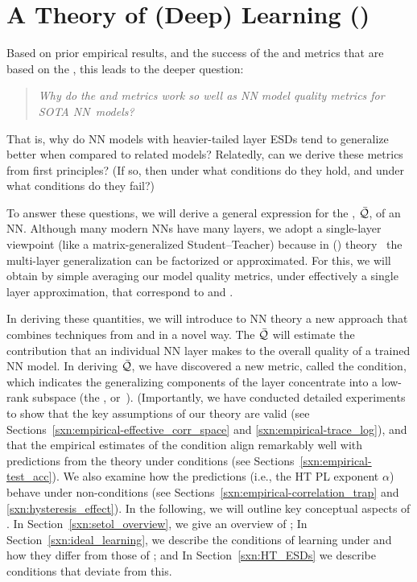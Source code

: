 \section{A \SemiEmpirical Theory of (Deep) Learning (\SETOL)}
\label{sxn:setol}
Based on prior empirical results, and the success of the \ALPHA and \ALPHAHAT metrics that are based on the \HTSR \Phenomenology, this leads to the deeper question: 
%
\begin{quote}
\emph{Why do the \ALPHA and \ALPHAHAT metrics work so well as NN model quality metrics for SOTA NN~models?}
\end{quote}
That is, why do NN models with heavier-tailed layer ESDs tend to generalize better when compared to related models?
Relatedly, can we derive these metrics from first principles?
(If so, then under what conditions do they hold, and under what conditions do they fail?)


\noindent
To answer these questions, we will derive a general expression for the \LayerQuality, $\bar{\mathcal{Q}}$, of an NN.
Although many modern NNs have many layers, we adopt a single-layer viewpoint (like a matrix-generalized Student–Teacher) because in \StatisticalMechanicsOfGeneralization (\SMOG) theory~\cite{SST92,STS90} the multi-layer generalization can be factorized or approximated.
For this, we will obtain by simple averaging our model quality metrics, under effectively a single layer approximation, that correspond to \ALPHA and \ALPHAHAT.


In deriving these quantities, we will introduce to NN theory a new \SemiEmpirical approach that combines techniques from \STATMECH and \RMT in a novel way.
The \LayerQuality $\bar{\mathcal{Q}}$ will estimate the contribution that an individual NN layer makes to the overall quality of a trained NN model.
In deriving $\bar{\mathcal{Q}}$, we have discovered a new \LayerQuality metric, called the \TRACELOG condition,
which indicates the generalizing components of the layer concentrate into a low-rank subspace
(the \emph{\EffectiveCorrelationSpace}, or~\ECS).
%
(Importantly, we have conducted detailed experiments to show that the key assumptions of our \SETOL theory are valid
(see Sections~\ref{sxn:empirical-effective_corr_space} and \ref{sxn:empirical-trace_log}),
and that the empirical estimates of the \SETOL \TRACELOG condition align remarkably well with predictions from the \HTSR
theory under \Ideal conditions (see Sections~\ref{sxn:empirical-test_acc}).
We also examine how the \HTSR predictions (i.e., the HT PL exponent $\alpha$) behave under non-\Ideal conditions (see Sections~\ref{sxn:empirical-correlation_trap} and \ref{sxn:hysteresis_effect}).
%
In the following, we will outline key conceptual aspects of \SETOL.
In Section~\ref{sxn:setol_overview}, we give an overview of \SETOL;
In Section~\ref{sxn:ideal_learning}, we describe the conditions of \Ideal learning under \SETOL and how they differ from those of \HTSR; and
In Section~\ref{sxn:HT_ESDs} we describe conditions that deviate from this.





